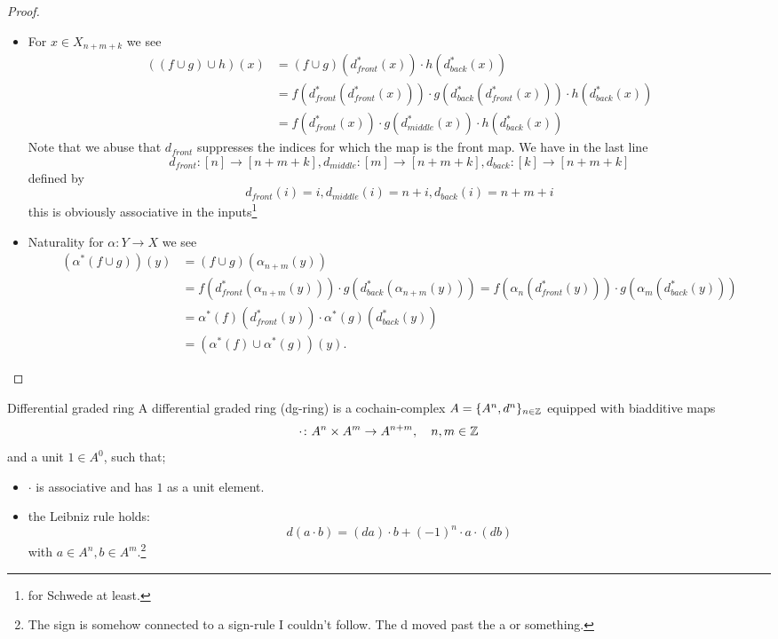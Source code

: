 \documentclass[language=english]{TemplateLecture}
\begin{document}
\begin{proof}
\begin{itemize}
        \item For \(x \in X_{n+m+k}\) we see
        \[\begin{split}
            ((f\cup g) \cup h)(x) &= (f\cup g) (d_{front}^*(x)) \cdot h(d_{back}^*(x)) \\
            &= f(d_{front}^*(d_{front}^*(x))) \cdot g(d_{back}^*(d_{front}^*(x))) \cdot h(d_{back}^*(x))\\
            & = f(d_{front}^*(x)) \cdot g(d_{middle}^*(x)) \cdot h(d_{back}^*(x))
        \end{split}\]
        Note that we abuse that \(d_{front}\) suppresses the indices for which the map is the front map.
        We have in the last line
        \[d_{front}\colon[n] \to [n+m+k], d_{middle}\colon [m] \to [n+m+k], d_{back}\colon [k] \to [n+m+k]\]
        defined by
        \[d_{front}(i) = i, d_{middle}(i) = n+i, d_{back}(i) = n+m+i\]
        this is obviously associative in the inputs\footnote{for Schwede at least.}
        \item Naturality for \(\alpha\colon Y \to X\) we see
        \[\begin{split}
            (\alpha^*(f\cup g))(y) &= (f\cup g)(\alpha_{n+m}(y)) \\
            &= f(d_{front}^*(\alpha_{n+m}(y))) \cdot g(d_{back}^*(\alpha_{n+m}(y))) = f(\alpha_n(d_{front}^*(y))) \cdot g(\alpha_m(d_{back}^*(y))) \\
            &= \alpha^*(f)(d_{front}^*(y)) \cdot \alpha^*(g)(d_{back}^*(y)) \\
            &= (\alpha^*(f) \cup \alpha^*(g))(y).
        \end{split}\]
    \end{itemize}
\end{proof}

\begin{defi}{Differential graded ring}{}
    A differential graded ring (dg-ring) is a cochain-complex \(A = \{A^n, d^n\}_{n \in \mathbb{Z}}\) equipped with biadditive maps
    \[\cdot\colon A^n \times A^m \to A^{n+m}, \quad n,m \in \mathbb{Z} \]
    and a unit \(1 \in A^0\), such that;
    \begin{itemize}
        \item \(\cdot\) is associative and has \(1\) as a unit element.
        \item the Leibniz rule holds:
        \[d(a\cdot b) = (da) \cdot b + (-1)^n \cdot a \cdot (db)\]
        with \(a \in A^n, b \in A^m\).\footnote{The sign is somehow connected to a sign-rule I couldn't follow. The d moved past the a or something.}
    \end{itemize}
\end{defi}
\end{document}
